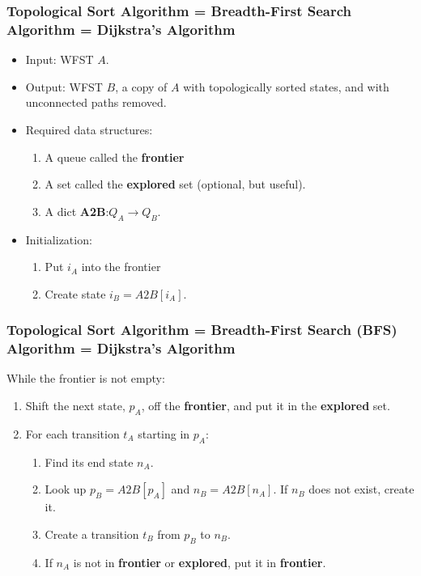 \documentclass{beamer}
\begin{document}
\begin{frame}
  \frametitle{Topological Sort Algorithm = Breadth-First Search Algorithm = Dijkstra's Algorithm}

  \begin{itemize}
  \item Input: WFST $A$.
  \item Output: WFST $B$, a copy of $A$ with topologically sorted
    states, and with unconnected paths removed.
  \item Required data structures:
    \begin{enumerate}
    \item A queue called the {\bf frontier}
    \item A set called the {\bf explored} set (optional, but useful).
    \item A dict {\bf A2B}:$Q_A\rightarrow Q_B$.
    \end{enumerate}
  \item Initialization:
    \begin{enumerate}
    \item Put $i_A$ into the frontier
    \item Create state $i_B=A2B[i_A]$.
    \end{enumerate}
  \end{itemize}
\end{frame}
\begin{frame}
  \frametitle{Topological Sort Algorithm = Breadth-First Search (BFS) Algorithm = Dijkstra's Algorithm}
  
  While the frontier is not empty:
  \begin{enumerate}
  \item Shift the next state, $p_A$, off the {\bf frontier}, and put
    it in the {\bf explored} set.
  \item For each transition $t_A$ starting in $p_A$:
    \begin{enumerate}
    \item Find its end state $n_A$.
    \item Look up $p_B=A2B[p_A]$ and $n_B=A2B[n_A]$.  If $n_B$ does
      not exist, create it.
    \item Create a transition $t_B$ from $p_B$ to $n_B$.
    \item If $n_A$ is not in {\bf frontier} or {\bf explored}, put it
      in {\bf frontier}.
    \end{enumerate}
  \end{enumerate}
\end{frame}      
\end{document}
